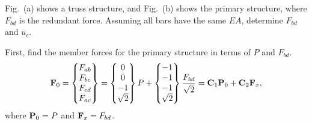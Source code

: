 \begin{example}[Truss]
Fig.~(a) shows a truss structure, and Fig.~(b) shows the primary structure, where $F_{bd}$ is the redundant force. Assuming all bars have the same $EA$, determine $F_{bd}$ and $u_c$.
\begin{fig}
  
\end{fig}
First, find the member forces for the primary structure in terms of $P$ and $F_{bd}$.
\begin{equation*}
  \mathbf{F}_0 = \begin{Bmatrix}F_{ab}\\ F_{bc}\\ F_{cd}\\ F_{ac}\end{Bmatrix} = \begin{Bmatrix}0\\ 0\\ -1\\ \sqrt2\end{Bmatrix}P + \begin{Bmatrix}-1\\ -1\\ -1\\ \sqrt2\end{Bmatrix}\frac{F_{bd}}{\sqrt2} = \mathbf{C}_1\mathbf{P}_0 + \mathbf{C}_2\mathbf{F}_x,
\end{equation*}
where $\mathbf{P}_0 = P$ and $\mathbf{F}_x = F_{bd}$.


\end{example}
